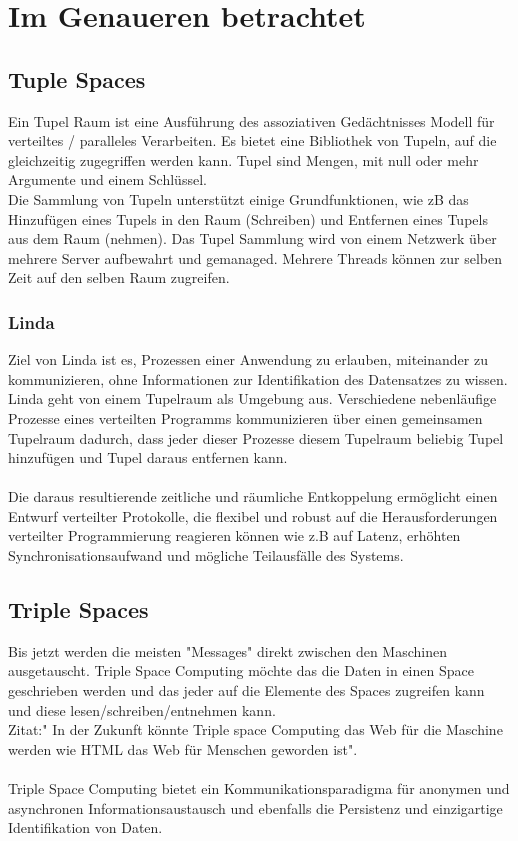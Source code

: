 \documentclass[a4paper,12pt]{scrreprt}
\begin{document}
\chapter{Im Genaueren betrachtet}
	\section{Tuple Spaces}
		
		Ein Tupel Raum ist eine Ausführung des assoziativen Gedächtnisses Modell für verteiltes / paralleles Verarbeiten. Es bietet eine Bibliothek von Tupeln, auf  die gleichzeitig zugegriffen werden kann. Tupel sind Mengen, mit null oder mehr Argumente und einem Schlüssel. \\		
		Die Sammlung von Tupeln unterstützt einige Grundfunktionen, wie zB das Hinzufügen eines Tupels in den Raum (Schreiben) und Entfernen eines Tupels aus dem Raum (nehmen). Das Tupel Sammlung wird von einem Netzwerk über mehrere Server aufbewahrt und gemanaged. Mehrere Threads können zur selben Zeit auf den selben Raum zugreifen.
		
		\subsection{Linda}
		Ziel von Linda ist es, Prozessen einer Anwendung zu erlauben, miteinander zu kommunizieren, ohne Informationen zur Identifikation des Datensatzes zu wissen. Linda geht von einem Tupelraum  als Umgebung aus. Verschiedene nebenläufige Prozesse eines verteilten Programms kommunizieren über einen gemeinsamen Tupelraum dadurch, dass jeder dieser Prozesse diesem Tupelraum beliebig Tupel hinzufügen und Tupel daraus entfernen kann.\\\\	
		Die daraus resultierende zeitliche und räumliche Entkoppelung ermöglicht einen Entwurf verteilter Protokolle, die flexibel und robust auf die Herausforderungen verteilter Programmierung reagieren können wie z.B auf Latenz, erhöhten Synchronisationsaufwand und mögliche Teilausfälle des Systems. 
		
		
		\section{Triple Spaces}
		
		Bis jetzt werden die meisten "Messages" direkt zwischen den Maschinen ausgetauscht. Triple Space Computing möchte das die Daten in einen
		Space geschrieben werden und das jeder auf die Elemente des Spaces zugreifen kann und diese lesen/schreiben/entnehmen kann.\\ %
		Zitat:" In der Zukunft könnte Triple space Computing das Web für die Maschine werden wie HTML das Web für Menschen geworden ist".\\ \\
		Triple Space Computing bietet ein Kommunikationsparadigma für anonymen und asynchronen Informationsaustausch und ebenfalls die Persistenz und einzigartige Identifikation von Daten.\\
			
\end{document}
